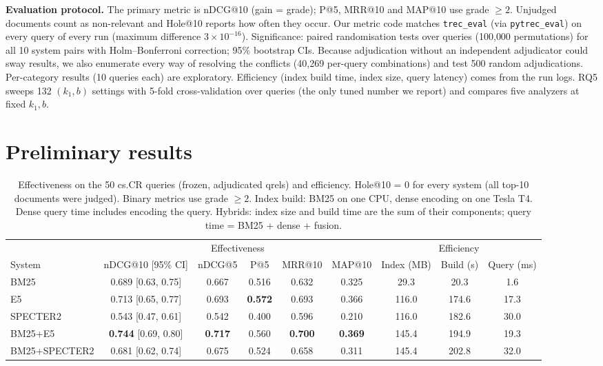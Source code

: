 \documentclass[10pt,a4paper]{article}
\newcommand{\sect}[1]{\vspace{2pt}\section{#1}\vspace{-2pt}}
\begin{document}
\textbf{Evaluation protocol.} The primary metric is nDCG@10 (gain = grade); P@5, MRR@10 and MAP@10 use grade
$\ge2$. Unjudged documents count as non-relevant and Hole@10 reports how often they occur. Our metric code
matches \texttt{trec\_eval} (via \texttt{pytrec\_eval}) on every query of every run (maximum difference
$3\times10^{-16}$). Significance: paired randomisation tests over queries (100{,}000 permutations) for all 10
system pairs with Holm--Bonferroni correction; 95\% bootstrap CIs. Because adjudication without an independent
adjudicator could sway results, we also enumerate every way of resolving the conflicts (40{,}269 per-query
combinations) and test 500 random adjudications. Per-category results (10 queries each) are exploratory.
Efficiency (index build time, index size, query latency) comes from the run logs. RQ5 sweeps 132 $(k_1,b)$
settings with 5-fold cross-validation over queries (the only tuned number we report) and compares five
analyzers at fixed $k_1, b$.

\sect{Preliminary results}
\begin{table}[H]\centering\small
\caption{Effectiveness on the 50 cs.CR queries (frozen, adjudicated qrels) and efficiency. Hole@10 = 0 for every
system (all top-10 documents were judged). Binary metrics use grade $\ge2$. Index build: BM25 on one CPU, dense
encoding on one Tesla T4. Dense query time includes encoding the query. Hybrids: index size and build time are
the sum of their components; query time = BM25 + dense + fusion.}
\label{tab:main}
\setlength{\tabcolsep}{4.2pt}
\begin{tabular}{@{}lcccccccc@{}}
\toprule
& \multicolumn{5}{c}{Effectiveness} & \multicolumn{3}{c}{Efficiency}\\
\cmidrule(lr){2-6}\cmidrule(l){7-9}
System & nDCG@10 [95\% CI] & nDCG@5 & P@5 & MRR@10 & MAP@10 & Index (MB) & Build (s) & Query (ms)\\
\midrule
BM25 & 0.689 [0.63, 0.75] & 0.667 & 0.516 & 0.632 & 0.325 & 29.3 & 20.3 & 1.6\\
E5 & 0.713 [0.65, 0.77] & 0.693 & \textbf{0.572} & 0.693 & 0.366 & 116.0 & 174.6 & 17.3\\
SPECTER2 & 0.543 [0.47, 0.61] & 0.542 & 0.400 & 0.596 & 0.210 & 116.0 & 182.6 & 30.0\\
BM25+E5 & \textbf{0.744} [0.69, 0.80] & \textbf{0.717} & 0.560 & \textbf{0.700} & \textbf{0.369} & 145.4 & 194.9 & 19.3\\
BM25+SPECTER2 & 0.681 [0.62, 0.74] & 0.675 & 0.524 & 0.658 & 0.311 & 145.4 & 202.8 & 32.0\\
\bottomrule
\end{tabular}
\end{table}
\end{document}
